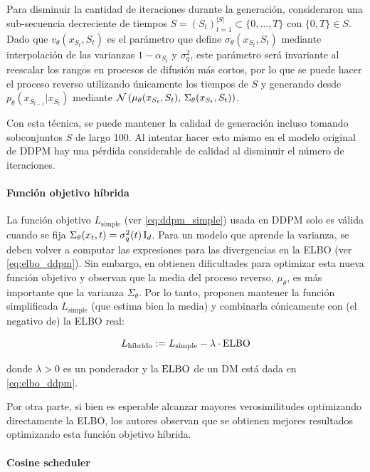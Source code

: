 Para disminuir la cantidad de iteraciones durante la generación, consideraron una sub-secuencia decreciente de tiempos $S=(S_t)_{t=1}^{|S|}\subset\{0,\ldots,T\}$ con $\{0,T\}\in S$. Dado que $v_\theta(x_{S_t},S_t)$ es el parámetro que define $\sigma_\theta(x_{S_t},S_t)$ mediante interpolación de las varianzas $1-\alpha_{S_t}$ y $\sigma_q^2$, este parámetro será invariante al reescalar los rangos en procesos de difusión más cortos, por lo que se puede hacer el proceso reverso utilizando únicamente los tiempos de $S$ y generando desde $p_\theta(x_{S_{t-1}}|x_{S_t})$ mediante $\mathcal{N}\left(\mu_\theta(x_{S_t}, S_t),\,\Sigma_\theta(x_{S_t}, S_t)\right)$.

Con esta técnica, se puede mantener la calidad de generación incluso tomando sobconjuntos $S$ de largo 100. Al intentar hacer esto mismo en el modelo original de DDPM hay una pérdida considerable de calidad al disminuir el número de iteraciones.

\paragraph{Función objetivo híbrida}

La función objetivo $L_{\text{simple}}$ (ver \eqref{eq:ddpm_simple}) usada en DDPM solo es válida cuando se fija $\Sigma_\theta(x_t,t) = \sigma_q^2(t)\operatorname{I}_{d}$. Para un modelo que aprende la varianza, se deben volver a computar las expresiones para las divergencias en la ELBO (ver \eqref{eq:elbo_ddpm}). Sin embargo, en \cite{nichol2021improved} obtienen dificultades para optimizar esta nueva función objetivo y observan que la media del proceso reverso, $\mu_\theta$, es más importante que la varianza $\Sigma_\theta$. Por lo tanto, proponen mantener la función simplificada $L_{\text{simple}}$ (que estima bien la media) y combinarla cónicamente con (el negativo de) la ELBO real:

\begin{equation*}
    L_{\text{híbrido}} := L_{\text{simple}} - \lambda\cdot\operatorname{ELBO}
\end{equation*}

donde $\lambda>0$ es un ponderador y la $\operatorname{ELBO}$ de un DM está dada en \eqref{eq:elbo_ddpm}.

Por otra parte, si bien es esperable alcanzar mayores verosimilitudes optimizando directamente la ELBO, los autores observan que se obtienen mejores resultados optimizando esta función objetivo híbrida.

\paragraph{Cosine scheduler}

